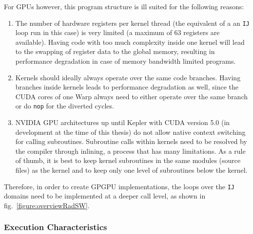 For GPUs however, this program structure is ill suited for the following reasons: 
\begin{enumerate}
 \item The number of hardware registers per kernel thread (the equivalent of a an \verb|IJ| loop run in this case) is very limited (a maximum of 63 registers are available). Having code with too much complexity inside one kernel will lead to the swapping of register data to the global memory, resulting in performance degradation in case of memory bandwidth limited programs.
 \item Kernels should ideally always operate over the same code branches. Having branches inside kernels leads to performance degradation as well, since the CUDA cores of one Warp always need to either operate over the same branch or do \verb|nop| for the diverted cycles.
 \item NVIDIA GPU architectures up until Kepler with CUDA version 5.0 (in development at the time of this thesis) do not allow native context switching for calling subroutines. Subroutine calls within kernels need to be resolved by the compiler through inlining, a process that has many limitations. As a rule of thumb, it is best to keep kernel subroutines in the same modules (source files) as the kernel and to keep only one level of subroutines below the kernel.
\end{enumerate}

Therefore, in order to create GPGPU implementations, the loops over the \verb|IJ| domains need to be implemented at a deeper call level, as shown in fig.~\ref{figure:overviewRadSW}.

\subsubsection{Execution Characteristics} \label{sub:swCharacteristics}

